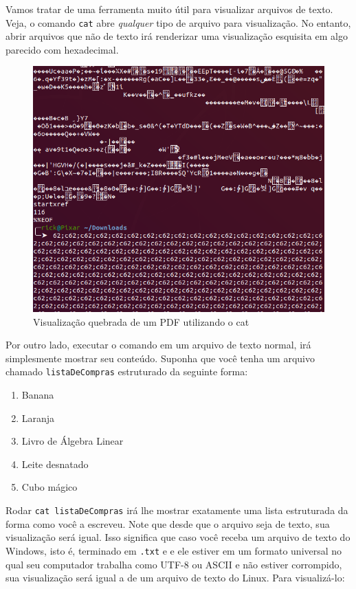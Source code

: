 \documentclass{article}
\begin{document}
	Vamos tratar de uma ferramenta muito útil para visualizar arquivos de texto. Veja, o comando \texttt{cat} abre 
	\textit{qualquer} tipo de arquivo para visualização. No entanto, abrir arquivos que não de texto irá renderizar 
	uma visualização esquisita em algo parecido com hexadecimal.

	\begin{figure}[ht!]
  		\centering
		\includegraphics[scale=0.3]{figs/brokenCat.png} 
  		\caption*{Visualização quebrada de um PDF utilizando o cat}
	\end{figure}


	Por outro lado, executar o comando em um arquivo de texto normal, irá simplesmente mostrar seu conteúdo. 
	Suponha que você tenha um arquivo chamado \texttt{listaDeCompras} estruturado da seguinte forma:

	\begin{enumerate}
		\item{Banana}
		\item{Laranja} 
		\item{Livro de Álgebra Linear} 
		\item{Leite desnatado} 
		\item{Cubo mágico} 
	\end{enumerate} 

	Rodar \texttt{cat listaDeCompras} irá lhe mostrar exatamente uma lista estruturada da forma como você a escreveu. 
	Note que desde que o arquivo seja de texto, sua visualização será igual. Isso significa que caso você receba um 
	arquivo de texto do Windows, isto é, terminado em \texttt{.txt} e e ele estiver em um formato universal no qual 
	seu computador trabalha como UTF-8 ou ASCII e não estiver corrompido, sua visualização será igual a de um arquivo 
	de texto do Linux. Para visualizá-lo: 
\end{document}
